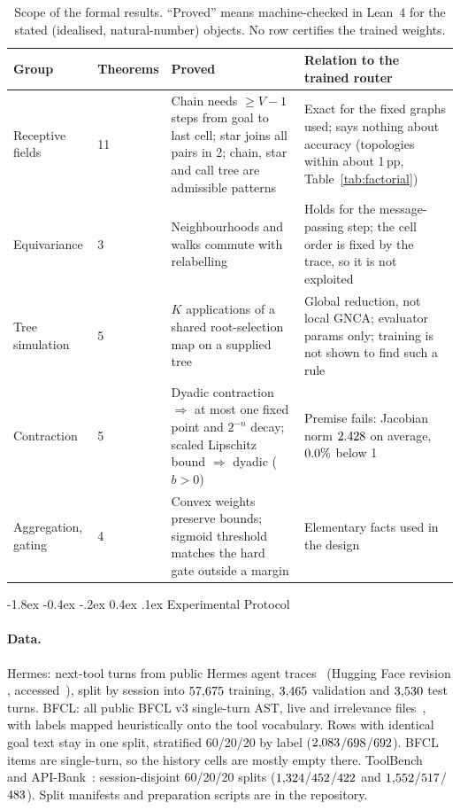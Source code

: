 \documentclass[10pt,twocolumn,letterpaper]{article}
\makeatletter
\renewcommand\section{\@startsection {section}{1}{\z@}%
  {-1.8ex \@plus -0.4ex \@minus -.2ex}%
  {0.4ex \@plus.1ex}%
  {\normalfont\normalsize\bfseries}}
\makeatother
\begin{document}
\begin{table}[t]
\centering
\footnotesize
\setlength{\tabcolsep}{3pt}
\caption{Scope of the formal results. ``Proved'' means machine-checked in Lean~4 for the stated (idealised, natural-number) objects. No row certifies the trained weights.}
\label{tab:theorem-scope}
\begin{tabularx}{\textwidth}{@{}p{2.4cm}p{1.3cm}XX@{}}
\toprule
Group & Theorems & Proved & Relation to the trained router \\
\midrule
Receptive fields & 11 & Chain needs $\ge V{-}1$ steps from goal to last cell; star joins all pairs in 2; chain, star and call tree are admissible patterns & Exact for the fixed graphs used; says nothing about accuracy (topologies within about 1\,pp, Table~\ref{tab:factorial}) \\
Equivariance & 3 & Neighbourhoods and walks commute with relabelling & Holds for the message-passing step; the cell order is fixed by the trace, so it is not exploited \\
Tree simulation & 5 & $K$ applications of a shared root-selection map on a supplied tree & Global reduction, not local GNCA; evaluator params only; training is not shown to find such a rule \\
Contraction & 5 & Dyadic contraction $\Rightarrow$ at most one fixed point and $2^{-n}$ decay; scaled Lipschitz bound $\Rightarrow$ dyadic ($b{>}0$) & Premise fails: Jacobian norm $2.428$ on average, $0.0\%$ below 1 \\
Aggregation, gating & 4 & Convex weights preserve bounds; sigmoid threshold matches the hard gate outside a margin & Elementary facts used in the design \\
\bottomrule
\end{tabularx}
\end{table}

\section{Experimental Protocol}\label{sec:protocol}
\paragraph{Data.} Hermes: next-tool turns from public Hermes agent traces~\cite{hermestraces} (Hugging Face revision \texttt{\numHermesDatasetRevFull{}}, accessed~\numHermesDatasetAccess{}), split by session into $57{,}675$ training, $3{,}465$ validation and $3{,}530$ test turns. BFCL: all public BFCL v3 single-turn AST, live and irrelevance files~\cite{gorilla-bfcl}, with labels mapped heuristically onto the tool vocabulary. Rows with identical goal text stay in one split, stratified 60/20/20 by label ($2{,}083$/$698$/$692$). BFCL items are single-turn, so the history cells are mostly empty there. ToolBench~\cite{qin2023toolllm} and API-Bank~\cite{li2023apibank}: session-disjoint 60/20/20 splits ($1{,}324$/$452$/$422$ and $1{,}552$/$517$/$483$). Split manifests and preparation scripts are in the repository.
\end{document}
